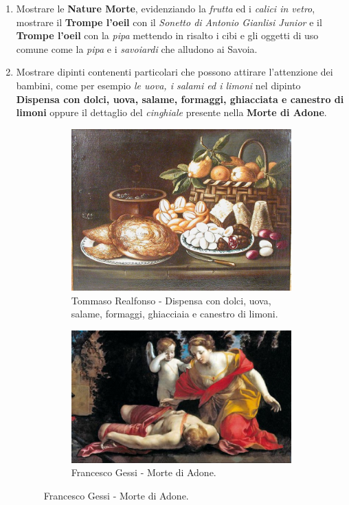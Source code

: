\documentclass[12pt,a4paper]{article}
\begin{document}
\begin{enumerate}
	\item Mostrare le \textbf{Nature Morte}, evidenziando la \textit{frutta} ed i \textit{calici in vetro}, mostrare il \textbf{Trompe l'oeil} con il \textit{Sonetto di Antonio Gianlisi Junior} e il \textbf{Trompe l'oeil} con la \textit{pipa} mettendo in risalto i cibi e gli oggetti di uso comune come la \textit{pipa} e i \textit{savoiardi} che alludono ai Savoia.
	\item Mostrare dipinti contenenti particolari che possono attirare l'attenzione dei bambini, come per esempio \textit{le uova, i salami ed i limoni} nel dipinto \textbf{Dispensa con dolci, uova, salame, formaggi, ghiacciata e canestro di limoni} oppure il dettaglio del \textit{cinghiale} presente nella \textbf{Morte di Adone}.
	\begin{figure}[h]
		\centering
		\begin{subfigure} [h]{0.4\textwidth}
			\centering
			\includegraphics[]{Dispensa_natura_morta.jpg}
			\caption{Tommaso Realfonso - Dispensa con dolci, uova, salame, formaggi, ghiacciaia e canestro di limoni.}
		\end{subfigure}
	\hfill
		\begin{subfigure}[h] {0.4\textwidth}
			\centering
			\includegraphics[scale=0.3]{Morte_di_Adone.jpg}
			\caption{Francesco Gessi - Morte di Adone.}
		\end{subfigure}
	\end{figure}
	
	\end{enumerate}
\newpage
\listoffigures
\end{document}
